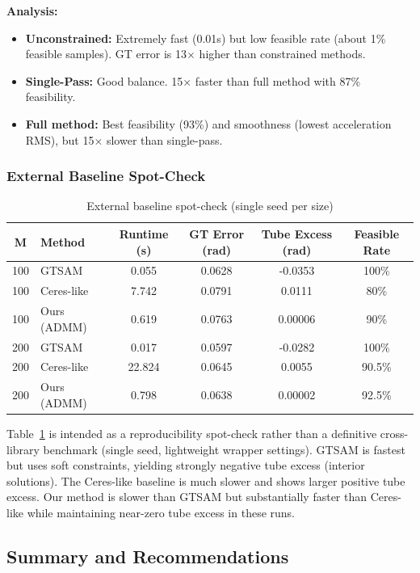 \textbf{Analysis:}
\begin{itemize}
\item \textbf{Unconstrained:} Extremely fast (0.01s) but low feasible rate (about 1\% feasible samples). GT error is 13$\times$ higher than constrained methods.
\item \textbf{Single-Pass:} Good balance. 15× faster than full method with 87\% feasibility.
\item \textbf{Full method:} Best feasibility (93\%) and smoothness (lowest acceleration RMS), but 15× slower than single-pass.
\end{itemize}

\subsubsection{External Baseline Spot-Check}

\begin{table}[htbp]
\centering
\caption{External baseline spot-check (single seed per size)}
\label{tab:external_spotcheck}
\begin{tabular}{c l c c c c}
\hline
\textbf{M} & \textbf{Method} & \textbf{Runtime (s)} & \textbf{GT Error (rad)} & \textbf{Tube Excess (rad)} & \textbf{Feasible Rate} \\
\hline
100 & GTSAM & 0.055 & 0.0628 & -0.0353 & 100\% \\
100 & Ceres-like & 7.742 & 0.0791 & 0.0111 & 80\% \\
100 & Ours (ADMM) & 0.619 & 0.0763 & 0.00006 & 90\% \\
200 & GTSAM & 0.017 & 0.0597 & -0.0282 & 100\% \\
200 & Ceres-like & 22.824 & 0.0645 & 0.0055 & 90.5\% \\
200 & Ours (ADMM) & 0.798 & 0.0638 & 0.00002 & 92.5\% \\
\hline
\end{tabular}
\end{table}

Table~\ref{tab:external_spotcheck} is intended as a reproducibility spot-check rather than a definitive cross-library benchmark (single seed, lightweight wrapper settings). GTSAM is fastest but uses soft constraints, yielding strongly negative tube excess (interior solutions). The Ceres-like baseline is much slower and shows larger positive tube excess. Our method is slower than GTSAM but substantially faster than Ceres-like while maintaining near-zero tube excess in these runs.

\subsection{Summary and Recommendations}

